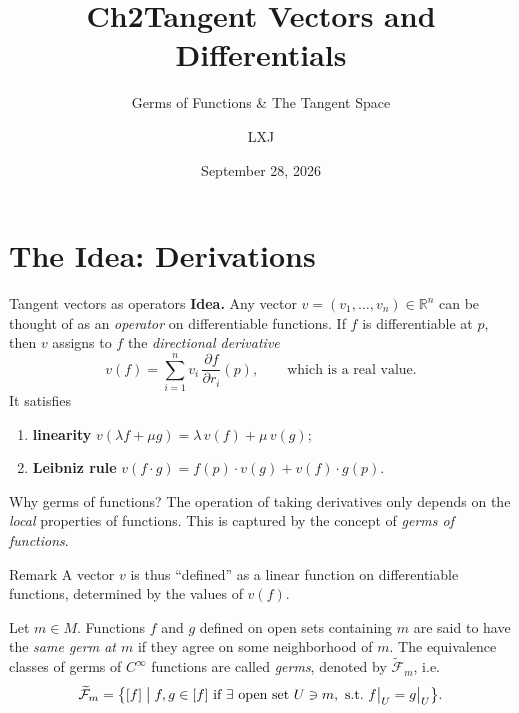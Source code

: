 \documentclass[10pt]{beamer}
\title{Ch2\quad Tangent Vectors and Differentials}
\subtitle{Germs of Functions \& The Tangent Space}
\date{September 28, 2026}
\author{LXJ}
\newcommand{\R}{\mathbb{R}}
\newcommand{\F}{\mathcal{F}}
\begin{document}
\maketitle

\section{The Idea: Derivations}

\begin{frame}{Tangent vectors as operators}
	\textbf{Idea.} Any vector $v = (v_1, \dots, v_n) \in \R^n$ can be thought
	of as an \emph{operator} on differentiable functions. If $f$ is
	differentiable at $p$, then $v$ assigns to $f$ the
	\emph{directional derivative}
	\[
		v(f) = \sum_{i=1}^{n} v_i \, \frac{\partial f}{\partial r_i}(p),
		\qquad \text{which is a real value.}
	\]
	It satisfies
	\begin{enumerate}
		\item \textbf{linearity}\quad
		      $v(\lambda f + \mu g) = \lambda\, v(f) + \mu\, v(g)$;
		\item \textbf{Leibniz rule}\quad
		      $v(f \cdot g) = f(p)\cdot v(g) + v(f)\cdot g(p)$.
	\end{enumerate}
\end{frame}

\begin{frame}{Why germs of functions?}
	The operation of taking derivatives only depends on the
	\emph{local} properties of functions. This is captured by the concept
	of \emph{germs of functions}.
	\begin{block}{Remark}
		A vector $v$ is thus ``defined'' as a linear function on
		differentiable functions, determined by the values of $v(f)$.
	\end{block}
	\begin{definition}
		Let $m \in M$. Functions $f$ and $g$ defined on open sets
		containing $m$ are said to have the \emph{same germ at $m$} if they
		agree on some neighborhood of $m$. The equivalence classes of germs
		of $C^\infty$ functions are called \emph{germs}, denoted by
		$\widetilde{\F}_m$, i.e.
		\[
			\widetilde{\F}_m = \bigl\{ [f] \bigm|
			f, g \in [f] \ \text{if } \exists \text{ open set } U \ni m,
			\ \text{s.t.\ } f\big|_U = g\big|_U \bigr\}.
		\]
	\end{definition}
\end{frame}

\end{document}
